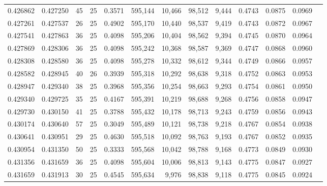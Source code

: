 \begin{tabular}{rrrrrrrrrrrrr}
0.426862 & 0.427250 &    45 &  25 &                                     0.3571 & 595,144 &  10,466 &  98,512 &   9,444 & 0.4743 & 0.0875 & 0.0969 \\
0.427261 & 0.427537 &    26 &  25 &                                     0.4902 & 595,170 &  10,440 &  98,537 &   9,419 & 0.4743 & 0.0872 & 0.0967 \\
0.427541 & 0.427863 &    36 &  25 &                                     0.4098 & 595,206 &  10,404 &  98,562 &   9,394 & 0.4745 & 0.0870 & 0.0964 \\
0.427869 & 0.428306 &    36 &  25 &                                     0.4098 & 595,242 &  10,368 &  98,587 &   9,369 & 0.4747 & 0.0868 & 0.0960 \\
0.428308 & 0.428580 &    36 &  25 &                                     0.4098 & 595,278 &  10,332 &  98,612 &   9,344 & 0.4749 & 0.0866 & 0.0957 \\
0.428582 & 0.428945 &    40 &  26 &                                     0.3939 & 595,318 &  10,292 &  98,638 &   9,318 & 0.4752 & 0.0863 & 0.0953 \\
0.428947 & 0.429340 &    38 &  25 &                                     0.3968 & 595,356 &  10,254 &  98,663 &   9,293 & 0.4754 & 0.0861 & 0.0950 \\
0.429340 & 0.429725 &    35 &  25 &                                     0.4167 & 595,391 &  10,219 &  98,688 &   9,268 & 0.4756 & 0.0858 & 0.0947 \\
0.429730 & 0.430150 &    41 &  25 &                                     0.3788 & 595,432 &  10,178 &  98,713 &   9,243 & 0.4759 & 0.0856 & 0.0943 \\
0.430174 & 0.430640 &    57 &  25 &                                     0.3049 & 595,489 &  10,121 &  98,738 &   9,218 & 0.4767 & 0.0854 & 0.0938 \\
0.430641 & 0.430951 &    29 &  25 &                                     0.4630 & 595,518 &  10,092 &  98,763 &   9,193 & 0.4767 & 0.0852 & 0.0935 \\
0.430954 & 0.431350 &    50 &  25 &                                     0.3333 & 595,568 &  10,042 &  98,788 &   9,168 & 0.4773 & 0.0849 & 0.0930 \\
0.431356 & 0.431659 &    36 &  25 &                                     0.4098 & 595,604 &  10,006 &  98,813 &   9,143 & 0.4775 & 0.0847 & 0.0927 \\
0.431659 & 0.431913 &    30 &  25 &                                     0.4545 & 595,634 &   9,976 &  98,838 &   9,118 & 0.4775 & 0.0845 & 0.0924 \\

\end{tabular}

